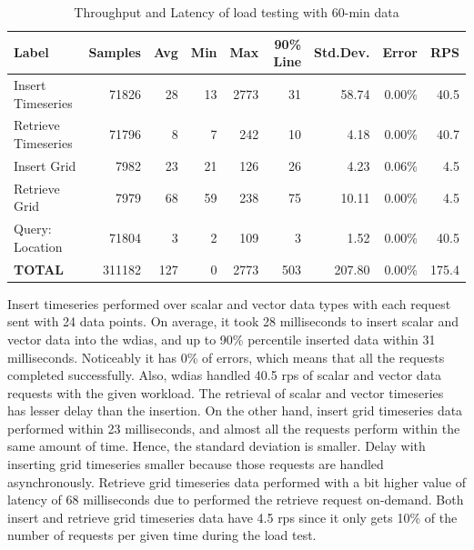\begin{table}[ht]
\caption{Throughput and Latency of load testing with 60-min data}
\footnotesize
\begin{tabulary}{\linewidth}{|L|R|R|R|R|R|R|R|R|}
\hline
\textbf{Label} & \textbf{Samples} & \textbf{Avg} & \textbf{Min} & \textbf{Max} & \textbf{90\% Line} & \textbf{Std.Dev.} & \textbf{Error} & \textbf{RPS} \\ \hline
Insert Timeseries & 71826 & 28 & 13 & 2773 & 31 & 58.74 & 0.00\% & 40.5 \\ \hline
Retrieve Timeseries & 71796 & 8 & 7 & 242 & 10 & 4.18 & 0.00\% & 40.7 \\ \hline
Insert Grid & 7982 & 23 & 21 & 126 & 26 & 4.23 & 0.06\% & 4.5 \\ \hline
Retrieve Grid & 7979 & 68 & 59 & 238 & 75 & 10.11 & 0.00\% & 4.5 \\ \hline
Query: Location & 71804 & 3 & 2 & 109 & 3 & 1.52 & 0.00\% & 40.5 \\ \hline
\textbf{TOTAL} & 311182 & 127 & 0 & 2773 & 503 & 207.80 & 0.00\% & 175.4 \\ \hline
\end{tabulary}
\label{tab:obs_all_60_min_summary}
\end{table}
Insert timeseries performed over scalar and vector data types with each request sent with 24 data points. On average, it took 28 milliseconds to insert scalar and vector data into the \acrshort{wdias}, and up to 90\% percentile inserted data within 31 milliseconds. Noticeably it has 0\% of errors, which means that all the requests completed successfully. Also, \acrshort{wdias} handled 40.5 \acrshort{rps} of scalar and vector data requests with the given workload. The retrieval of scalar and vector timeseries has lesser delay than the insertion.
On the other hand, insert grid timeseries data performed within 23 milliseconds, and almost all the requests perform within the same amount of time. Hence, the standard deviation is smaller. Delay with inserting grid timeseries smaller because those requests are handled asynchronously. Retrieve grid timeseries data performed with a bit higher value of latency of 68 milliseconds due to performed the retrieve request on-demand. Both insert and retrieve grid timeseries data have 4.5 \acrshort{rps} since it only gets 10\% of the number of requests per given time during the load test.

